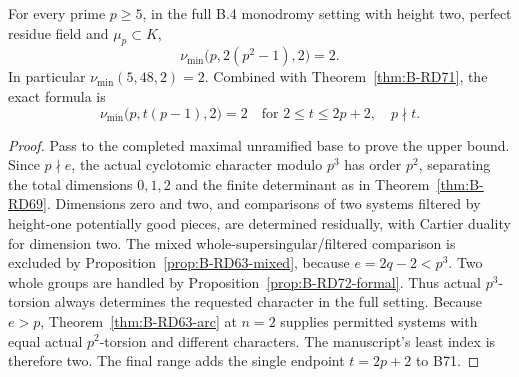 \begin{theorem}
\label{thm:B-RD72}
For every prime \(p\ge5\), in the full B.4 monodromy setting
with height two, perfect residue field and \(\mu_p\subset K\),
\[
 \boxed{\nu_{\min}\bigl(p,2(p^2-1),2\bigr)=2.}
 \tag{B-RD72.13}
\]
In particular \(\nu_{\min}(5,48,2)=2\).
Combined with Theorem~\ref{thm:B-RD71}, the exact formula is
\[
 \nu_{\min}\bigl(p,t(p-1),2\bigr)=2
 \quad\text{for }2\le t\le2p+2,\quad p\nmid t.
 \tag{B-RD72.14}
\]
\end{theorem}
\begin{proof}
Pass to the completed maximal unramified base to prove the
upper bound. Since \(p\nmid e\), the actual cyclotomic character
modulo \(p^3\) has order \(p^2\), separating the total dimensions
\(0,1,2\) and the finite determinant as in
Theorem~\ref{thm:B-RD69}. Dimensions zero and two, and comparisons
of two systems filtered by height-one potentially good pieces,
are determined residually, with Cartier duality for dimension two.
The mixed whole-supersingular/filtered comparison is excluded by
Proposition~\ref{prop:B-RD63-mixed}, because
\(e=2q-2<p^3\). Two whole groups are handled by
Proposition~\ref{prop:B-RD72-formal}. Thus actual \(p^3\)-torsion
always determines the requested character in the full setting.
Because \(e>p\), Theorem~\ref{thm:B-RD63-arc} at \(n=2\)
supplies permitted systems with equal actual \(p^2\)-torsion and
different characters. The manuscript's least index is therefore
two. The final range adds the single endpoint \(t=2p+2\) to B71.
\end{proof}

